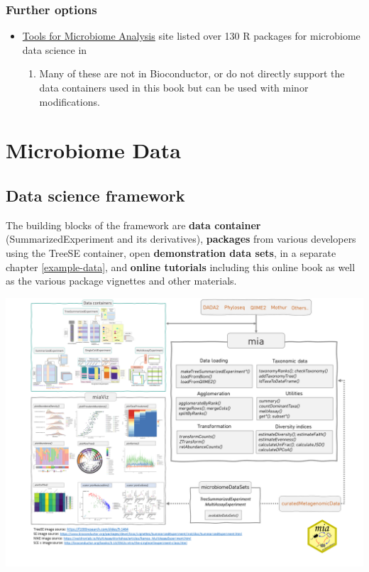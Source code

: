 \documentclass[
]{book}
\providecommand{\tightlist}{%
  \setlength{\itemsep}{0pt}\setlength{\parskip}{0pt}}
\begin{document}
\hypertarget{further-options}{%
\subsection{Further options}\label{further-options}}

\begin{itemize}
\tightlist
\item
  \href{https://microsud.github.io/Tools-Microbiome-Analysis/}{Tools for Microbiome
  Analysis}
  site listed over 130 R packages for microbiome data science in

  \begin{enumerate}
  \def\labelenumi{\arabic{enumi}.}
  \setcounter{enumi}{2022}
  \tightlist
  \item
    Many of these are not in Bioconductor, or do not directly
    support the data containers used in this book but can be used with
    minor modifications.
  \end{enumerate}
\end{itemize}

\hypertarget{containers}{%
\chapter{Microbiome Data}\label{containers}}

\hypertarget{data-science-framework}{%
\section{Data science framework}\label{data-science-framework}}

The building blocks of the framework are \textbf{data container}
(SummarizedExperiment and its derivatives), \textbf{packages} from various
developers using the TreeSE container, open \textbf{demonstration data
sets}, in a separate chapter \ref{example-data}, and \textbf{online
tutorials} including this online book as well as the various package
vignettes and other materials.

\includegraphics[width=18.67in]{general/figures/FigureOverviewV2_mod}
\end{document}
